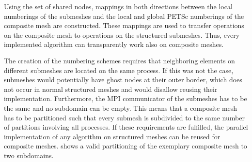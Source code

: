Using the set of shared nodes, mappings in both directions between the local numberings of the submeshes and the local and global PETSc numberings of the composite mesh are constructed. These mappings are used to transfer operations on the composite mesh to operations on the structured submeshes. Thus, every implemented algorithm can transparently work also on composite meshes.

The creation of the numbering schemes requires that neighboring elements on different submeshes are located on the same process. If this was not the case, submeshes would potentially have ghost nodes at their outer border, which does not occur in normal structured meshes and would disallow reusing their implementation.
Furthermore, the MPI communicator of the submeshes has to be the same and no subdomain can be empty. This means that a composite mesh has to be partitioned such that every submesh is subdivided to the same number of partitions involving all processes. If these requirements are fulfilled, the parallel implementation of any algorithm on structured meshes can be reused for composite meshes.
 shows a valid partitioning of the exemplary composite mesh to two subdomains.

